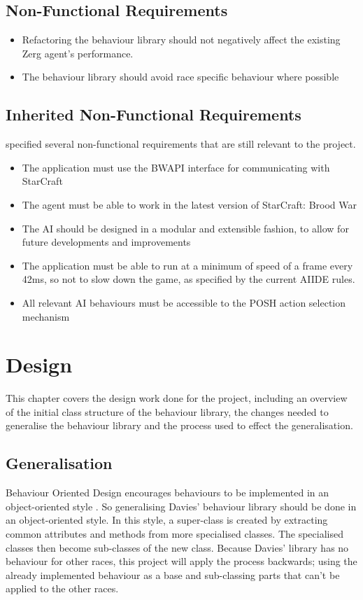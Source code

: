 \documentclass[11pt,openright,a4paper]{report}
\begin{document}
\section{Non-Functional Requirements}
\begin{itemize}
\item{Refactoring the behaviour library should not negatively affect the existing Zerg agent's performance.}
\item{The behaviour library should avoid race specific behaviour where possible}
\end{itemize}

\section{Inherited Non-Functional Requirements}
 specified several non-functional requirements that are still relevant to the project.
\begin{itemize}
\item{The application must use the BWAPI interface for communicating with StarCraft}
\item{The agent must be able to work in the latest version of StarCraft: Brood War}
\item{The AI should be designed in a modular and extensible fashion, to allow for future developments and improvements}
\item{The application must be able to run at a minimum of speed of a frame every 42ms, so not to slow down the game, as specified by the current AIIDE rules.}
\item{All relevant AI behaviours must be accessible to the POSH action selection mechanism}
\end{itemize}


\chapter{Design}
This chapter covers the design work done for the project, including an overview of the initial class structure of the behaviour library, the changes needed to generalise the behaviour library and the process used to effect the generalisation.

\section{Generalisation}
Behaviour Oriented Design encourages behaviours to be implemented in an object-oriented style \cite{bryson2003behavior}. So generalising Davies' behaviour library should be done in an object-oriented style. In this style, a super-class is created by extracting common attributes and methods from more specialised classes. The specialised classes then become sub-classes of the new class. Because Davies' library has no behaviour for other races, this project will apply the process backwards; using the already implemented behaviour as a base and sub-classing parts that can't be applied to the other races.
\end{document}
